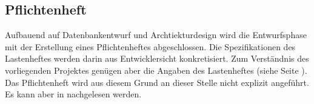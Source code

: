 \subsection{Pflichtenheft}
\label{sec:Pflichtenheft}

Aufbauend auf Datenbankentwurf und Archtiekturdesign wird die Entwurfsphase mit der Erstellung eines Pflichtenheftes abgeschlossen. Die Spezifikationen des Lastenheftes werden darin aus Entwicklersicht konkretisiert. Zum Verständnis des vorliegenden Projektes genügen aber die Angaben des Lastenheftes (siehe Seite \pageref{sec:Lastenheft}). Das Pflichtenheft wird aus diesem Grund an dieser Stelle nicht explizit angeführt. Es kann aber in \citet{pflichtenheft2013} nachgelesen werden.